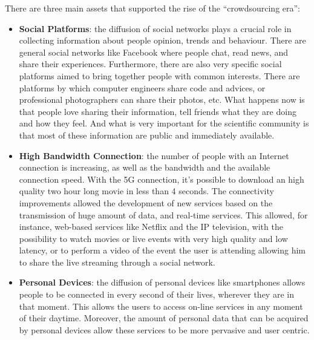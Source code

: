 There are three main assets that supported the rise of the ``crowdsourcing era'':
\begin{itemize}
	\item \textbf{Social Platforms}: the diffusion of social networks plays a crucial role in collecting information about people opinion, trends and behaviour. There are general social networks like Facebook where people chat, read news, and share their experiences. Furthermore, there are also very specific social platforms aimed to bring together people with common interests. There are platforms by which computer engineers share code and advices, or professional photographers can share their photos, etc. What happens now is that people love sharing their information, tell friends what they are doing and how they feel. And what is very important for the scientific community is that most of these information are public and immediately available.
	\item \textbf{High Bandwidth Connection}: the number of people with an Internet connection is increasing, as well as the bandwidth and the available connection speed. With the 5G connection, it's possible to download an high quality two hour long movie in less than 4 seconds. 
	The connectivity improvements allowed the development of new services based on the transmission of huge amount of data, and real-time services. This allowed, for instance, web-based services like Netflix and the IP television, with the possibility to watch movies or live events with very high quality and low latency, or to perform a video of the event the user is attending allowing him to share the live streaming through a social network.
	\item \textbf{Personal Devices}: the diffusion of personal devices like smartphones allows people to be connected in every second of their lives, wherever they are in that moment. This allows the users to access on-line services in any moment of their daytime. Moreover, the amount of personal data that can be acquired by personal devices allow these services to be more pervasive and user centric.%
\end{itemize}

